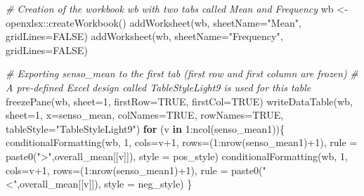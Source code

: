 \documentclass[
]{book}
\newenvironment{Shaded}{\begin{snugshade}}{\end{snugshade}}
\newcommand{\AttributeTok}[1]{\textcolor[rgb]{0.77,0.63,0.00}{#1}}
\newcommand{\CommentTok}[1]{\textcolor[rgb]{0.56,0.35,0.01}{\textit{#1}}}
\newcommand{\ConstantTok}[1]{\textcolor[rgb]{0.00,0.00,0.00}{#1}}
\newcommand{\ControlFlowTok}[1]{\textcolor[rgb]{0.13,0.29,0.53}{\textbf{#1}}}
\newcommand{\DecValTok}[1]{\textcolor[rgb]{0.00,0.00,0.81}{#1}}
\newcommand{\FunctionTok}[1]{\textcolor[rgb]{0.00,0.00,0.00}{#1}}
\newcommand{\NormalTok}[1]{#1}
\newcommand{\OtherTok}[1]{\textcolor[rgb]{0.56,0.35,0.01}{#1}}
\newcommand{\SpecialCharTok}[1]{\textcolor[rgb]{0.00,0.00,0.00}{#1}}
\newcommand{\StringTok}[1]{\textcolor[rgb]{0.31,0.60,0.02}{#1}}
\begin{document}
\begin{Shaded}
\begin{Highlighting}[]
\CommentTok{\# Creation of the workbook wb with two tabs called Mean and Frequency}
\NormalTok{wb }\OtherTok{\textless{}{-}}\NormalTok{ openxlsx}\SpecialCharTok{::}\FunctionTok{createWorkbook}\NormalTok{()}
\FunctionTok{addWorksheet}\NormalTok{(wb, }\AttributeTok{sheetName=}\StringTok{"Mean"}\NormalTok{, }\AttributeTok{gridLines=}\ConstantTok{FALSE}\NormalTok{)}
\FunctionTok{addWorksheet}\NormalTok{(wb, }\AttributeTok{sheetName=}\StringTok{"Frequency"}\NormalTok{, }\AttributeTok{gridLines=}\ConstantTok{FALSE}\NormalTok{)}

\CommentTok{\# Exporting senso\_mean to the first tab (first row and first column are frozen)}
\CommentTok{\# A pre{-}defined Excel design called TableStyleLight9 is used for this table}
\FunctionTok{freezePane}\NormalTok{(wb, }\AttributeTok{sheet=}\DecValTok{1}\NormalTok{, }\AttributeTok{firstRow=}\ConstantTok{TRUE}\NormalTok{, }\AttributeTok{firstCol=}\ConstantTok{TRUE}\NormalTok{)}
\FunctionTok{writeDataTable}\NormalTok{(wb, }\AttributeTok{sheet=}\DecValTok{1}\NormalTok{, }\AttributeTok{x=}\NormalTok{senso\_mean, }
               \AttributeTok{colNames=}\ConstantTok{TRUE}\NormalTok{, }\AttributeTok{rowNames=}\ConstantTok{TRUE}\NormalTok{, }
               \AttributeTok{tableStyle=}\StringTok{"TableStyleLight9"}\NormalTok{)}
\ControlFlowTok{for}\NormalTok{ (v }\ControlFlowTok{in} \DecValTok{1}\SpecialCharTok{:}\FunctionTok{ncol}\NormalTok{(senso\_mean1))\{}
  \FunctionTok{conditionalFormatting}\NormalTok{(wb, }\DecValTok{1}\NormalTok{, }\AttributeTok{cols=}\NormalTok{v}\SpecialCharTok{+}\DecValTok{1}\NormalTok{, }\AttributeTok{rows=}\NormalTok{(}\DecValTok{1}\SpecialCharTok{:}\FunctionTok{nrow}\NormalTok{(senso\_mean1)}\SpecialCharTok{+}\DecValTok{1}\NormalTok{), }
                        \AttributeTok{rule =} \FunctionTok{paste0}\NormalTok{(}\StringTok{"\textgreater{}"}\NormalTok{,overall\_mean[[v]]),}
                        \AttributeTok{style =}\NormalTok{ pos\_style)}
  \FunctionTok{conditionalFormatting}\NormalTok{(wb, }\DecValTok{1}\NormalTok{, }\AttributeTok{cols=}\NormalTok{v}\SpecialCharTok{+}\DecValTok{1}\NormalTok{, }\AttributeTok{rows=}\NormalTok{(}\DecValTok{1}\SpecialCharTok{:}\FunctionTok{nrow}\NormalTok{(senso\_mean1)}\SpecialCharTok{+}\DecValTok{1}\NormalTok{), }
                        \AttributeTok{rule =} \FunctionTok{paste0}\NormalTok{(}\StringTok{"\textless{}"}\NormalTok{,overall\_mean[[v]]),}
                        \AttributeTok{style =}\NormalTok{ neg\_style)}
\NormalTok{\}}


\end{Highlighting}
\end{Shaded}
\end{document}
